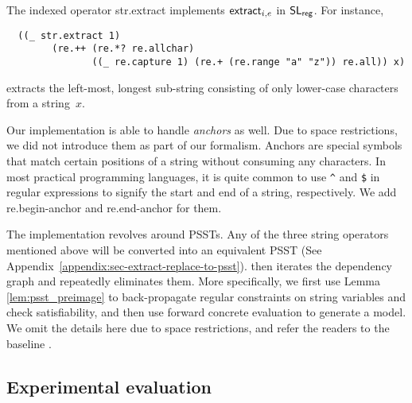 The indexed operator {\sf str.extract} implements $\mathsf{extract}_{i, e}$ in
$\mathsf{SL}_{\sf reg}$. For instance,
%
{\small
\begin{verbatim}
  ((_ str.extract 1)
        (re.++ (re.*? re.allchar)
               ((_ re.capture 1) (re.+ (re.range "a" "z")) re.all)) x)
\end{verbatim}
}
extracts the left-most, longest sub-string consisting of only lower-case
characters from a string~$x$.

Our implementation is able to handle \textit{anchors} as well. Due to space restrictions, we did not introduce them as part of our formalism. Anchors are special symbols that match certain positions of a string without consuming any characters. In most practical programming languages, it is quite common to use \verb!^! and \verb!$! in regular expressions to signify the start and end of a string, respectively. We add \textsf{re.begin-anchor} and \textsf{re.end-anchor} for them.

The implementation revolves around PSSTs. Any of the three string operators mentioned above will be converted into an equivalent PSST (See Appendix~\ref{appendix:sec-extract-replace-to-psst}). {\ostrich} then iterates the dependency graph and repeatedly eliminates them. More specifically, we first use Lemma \ref{lem:psst_preimage} to back-propagate regular constraints on string variables and check satisfiability, and then use forward concrete evaluation to generate a model. We omit the details here due to space restrictions, and refer the readers to the baseline \cite{CHL+19}.

\subsection{Experimental evaluation}

